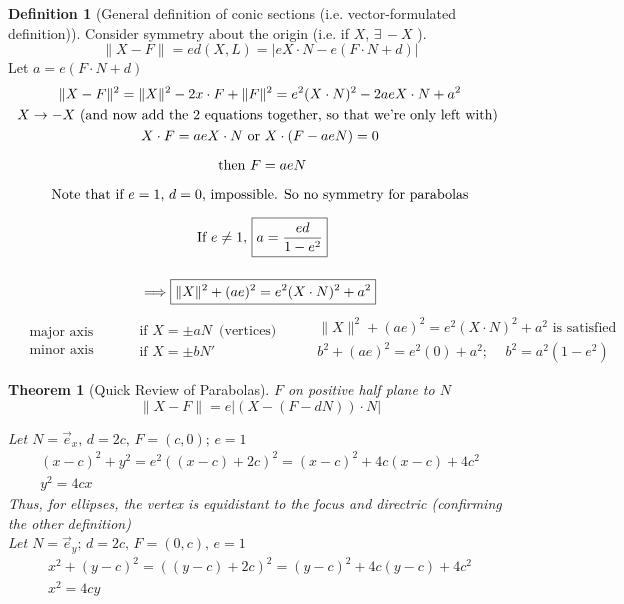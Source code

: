 \documentclass[twoside]{amsart}
\theoremstyle{plain}
\newtheorem{theorem}{Theorem}
\theoremstyle{definition}
\newtheorem{definition}{Definition}
\begin{document}
\begin{definition}[General definition of conic sections (i.e. vector-formulated definition)]
Consider symmetry about the origin (i.e. if $X$, $\exists \, - X$ ).  
\[
\| X - F \| = e d(X,L) = |e X \cdot N - e(F\cdot N +d) |
\]
Let $\boxed{ a = e(F\cdot N + d) }$
\[
\begin{gathered}
  \| X - F \|^2 = \| X\|^2 - 2x\cdot F + \| F\|^2 = e^2 ( X\cdot N)^2 - 2ae X\cdot N + a^2 \\
  X \to -X \text{ (and now add the 2 equations together, so that we're only left with) } \\
  X\cdot F = aeX\cdot N \text{ or } X \cdot (F- aeN) = 0 \medskip \\
  \text{ then } F = aeN \medskip \\
  \text{ Note that if $e=1$, $d=0$, impossible.  So no symmetry for parabolas } \medskip \\
  \text{ If } e\neq 1, \, \boxed{ a = \frac{ed}{1-e^2} } \bigskip \\
  \Longrightarrow \boxed{ \| X\|^2 + (ae)^2 = e^2 ( X\cdot N)^2 + a^2 }
\end{gathered}
\]
\[
\begin{aligned}
  & \text{ major axis } \\
  & \text{ minor axis }
\end{aligned} \quad 
\begin{aligned}
  & \text{ if } X = \pm a N \, \text{ (vertices) } \\
  & \text{ if } X = \pm b N' 
\end{aligned} \quad 
\begin{aligned}
  & \| X \|^2 + (ae)^2 = e^2 (X \cdot N)^2 + a^2 \text{ is satisfied } \\
  & b^2 + (ae)^2 = e^2 (0) + a^2; \quad \, b^2 = a^2 (1-e^2) 
\end{aligned}
\]
\end{definition}

\begin{theorem}[Quick Review of Parabolas]\label{T:Parabolas_Quick_Review}
$F$ on positive half plane to $N$
\[
\|X - F \| = e |(X - (F-dN))\cdot N |
\]

Let $N =\vec{e}_x, \, d=2c, \, F = (c,0); \, e=1$ 
\[
\begin{gathered}
  (x-c)^2 + y^2 = e^2 ((x-c) + 2c)^2 = (x-c)^2 + 4c(x-c) + 4c^2 \\
  y^2 = 4cx
\end{gathered}
\]
Thus, for ellipses, the vertex is equidistant to the focus and directric (confirming the other definition) \bigskip \\

Let $N= \vec{e}_y; \, d=2c, \, F = (0,c), \, e=1$ 
\[
\begin{gathered}
  x^2 + (y-c)^2 = ((y-c) +2c)^2 = (y-c)^2 + 4c(y-c) + 4c^2 \\
  x^2 = 4 cy
\end{gathered}
\]
\end{theorem}
\quad \\
\end{document}
